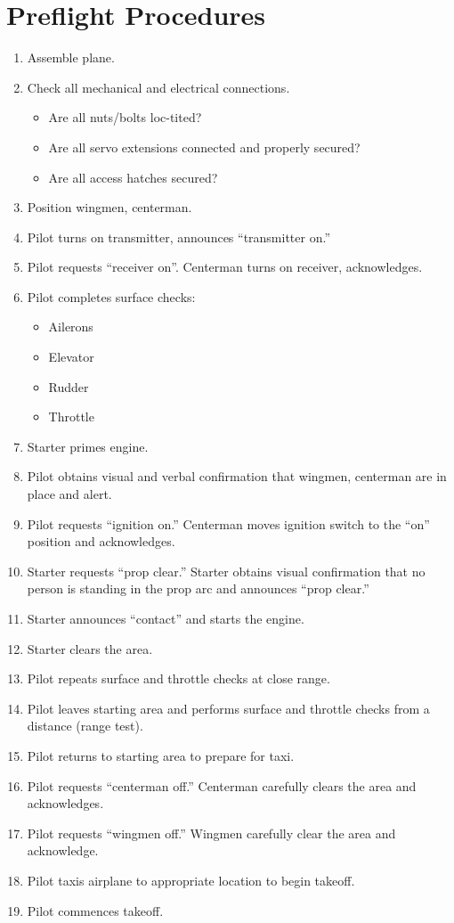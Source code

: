 \documentclass[10pt]{report}
\newcommand{\itemspace}{	\setlength{\itemsep}{0cm} \setlength{\parskip}{0cm}}
\begin{document}
\section{Preflight Procedures}
\label{sec:appendix_preflight}
\begin{enumerate}
	\setlength{\itemsep}{0cm}
	\setlength{\parskip}{0cm}
	\item Assemble plane.
	\item Check all mechanical and electrical connections.
		\begin{itemize}
		\itemspace
		\item Are all nuts/bolts loc-tited?
		\item Are all servo extensions connected and properly secured?
		\item Are all access hatches secured?
		\end{itemize}
	\item Position wingmen\footnotemark, centerman\footnotemark.
	\item Pilot turns on transmitter, announces ``transmitter on.''
	\item Pilot requests ``receiver on''.  Centerman turns on receiver, acknowledges.
	\item Pilot completes surface checks:
		\begin{itemize}
		\itemspace
		\item Ailerons
		\item Elevator
		\item Rudder
		\item Throttle
		\end{itemize}
	\item Starter primes engine.
	\item Pilot obtains visual and verbal confirmation that wingmen, centerman are in place and alert.
	\item Pilot requests ``ignition on.''  Centerman moves ignition switch to the ``on'' position and acknowledges.
	\item Starter requests ``prop clear.''  Starter obtains visual confirmation that no person is standing in the prop arc and announces ``prop clear.''
	\item Starter announces ``contact'' and starts the engine.
	\item Starter clears the area.
	\item Pilot repeats surface and throttle checks at close range.
	\item Pilot leaves starting area and performs surface and throttle checks from a distance (range test).
	\item Pilot returns to starting area to prepare for taxi.
	\item Pilot requests ``centerman off.''  Centerman carefully clears the area and acknowledges.
	\item Pilot requests ``wingmen off.''  Wingmen carefully clear the area and acknowledge.
	\item Pilot taxis airplane to appropriate location to begin takeoff.
	\item Pilot commences takeoff.

\end{enumerate}
\end{document}

